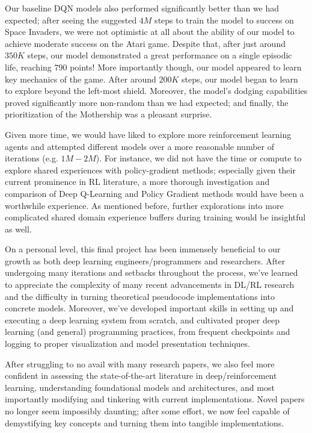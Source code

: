 \documentclass{article} %
\begin{document}
Our baseline DQN models also performed significantly better than we had expected; after seeing the
suggested $4M$ steps to train the model to success on Space Invaders, we were not optimistic at all
about the ability of our model to achieve moderate success on the Atari game. Despite that, after
just around $350K$ steps, our model demonstrated a great performance on a single episodic life,
reaching $790$ points! More importantly though, our model appeared to learn key mechanics of the
game. After around $200K$ steps, our model began to learn to explore beyond the left-most shield.
Moreover, the model's dodging capabilities proved significantly more non-random than we had
expected; and finally, the prioritization of the Mothership was a pleasant surprise.

Given more time, we would have liked to explore more reinforcement learning agents and attempted
different models over a more reasonable number of iterations (e.g. $1M-2M$). For instance, we did
not have the time or compute to explore shared experiences with policy-gradient methods; especially
given their current prominence in RL literature, a more thorough investigation and comparison of
Deep Q-Learning and Policy Gradient methods would have been a worthwhile experience. As mentioned
before, further explorations into more complicated shared domain experience buffers during training
would be insightful as well.

On a personal level, this final project has been immensely beneficial to our growth as both deep
learning engineers/programmers and researchers. After undergoing many iterations and setbacks
throughout the process, we've learned to appreciate the complexity of many recent advancements in
DL/RL research and the difficulty in turning theoretical pseudocode implementations into concrete
models. Moreover, we've developed important skills in setting up and executing a deep learning
system from scratch, and cultivated proper deep learning (and general) programming practices, from
frequent checkpoints and logging to proper visualization and model presentation techniques.

After struggling to no avail with many research papers, we also feel more confident in assessing the
state-of-the-art literature in deep/reinforcement learning, understanding foundational models and
architectures, and most importantly modifying and tinkering with current implementations.  Novel
papers no longer seem impossibly daunting; after some effort, we now feel capable of demystifying
key concepts and turning them into tangible implementations. 
\end{document}

